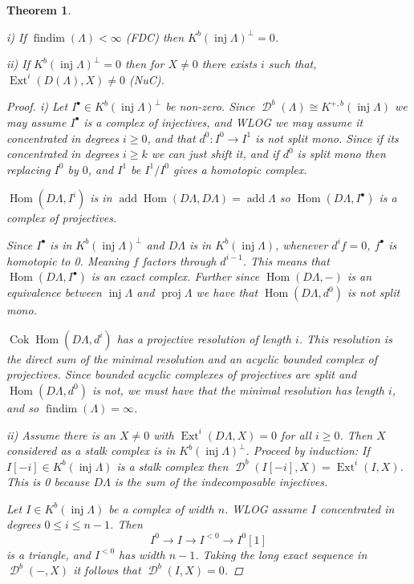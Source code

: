 \documentclass[11pt, a4paper, english]{article}
\newtheorem{theorem}{Theorem}[section]
\theoremstyle{definition}
\DeclareMathOperator{\Hom}{Hom}
\DeclareMathOperator{\Ext}{Ext}
\DeclareMathOperator{\cok}{Cok}
\DeclareMathOperator{\findim}{findim}
\DeclareMathOperator{\inj}{inj}
\DeclareMathOperator{\proj}{proj}
\DeclareMathOperator{\add}{add}
\DeclareMathOperator{\D}{\mathcal{D}}
\begin{document}
\begin{theorem} \cite[1.2]{Hap93} \label{thm:findim_implies_inj_generate}
	\item[i)] If $\findim(\Lambda) < \infty$ (FDC) then $K^b(\inj\Lambda)^\perp = 0$.
	\item[ii)] If $K^b(\inj\Lambda)^\perp = 0$ then for $X\neq 0$ there exists $i$ such that, $\Ext^i(D(\Lambda), X) \neq 0$ (NuC).
	\begin{proof}
		\item[i)] Let $I^\bullet \in K^b(\inj\Lambda)^\perp$ be non-zero. Since $\D^b(\Lambda) \cong K^{+,b}(\inj\Lambda)$ we may assume $I^\bullet$ is a complex of injectives, and WLOG we may assume it concentrated in degrees $i \geq 0$, and that $d^0:I^0 \to I^1$ is not split mono. Since if its concentrated in degrees $i \geq k$ we can just shift it, and if $d^0$ is split mono then replacing $I^0$ by $0$, and $I^1$ be $I^1/I^0$ gives a homotopic complex.
		
		$\Hom(D\Lambda, I^i)$ is in $\add\Hom(D\Lambda, D\Lambda) = \add\Lambda$ so $\Hom(D\Lambda, I^\bullet)$ is a complex of projectives.
		
		
		Since $I^\bullet$ is in $K^b(\inj\Lambda)^\perp$ and $D\Lambda$ is in $K^b(\inj\Lambda)$, whenever $d^if=0$, $f^\bullet$ is homotopic to 0. Meaning $f$ factors through $d^{i-1}$. This means that $\Hom(D\Lambda, I^\bullet)$ is an exact complex. Further since $\Hom(D\Lambda, -)$ is an equivalence between $\inj\Lambda$ and $\proj\Lambda$ we have that $\Hom(D\Lambda, d^0)$ is not split mono.
		
		$\cok\Hom(D\Lambda, d^i)$ has a projective resolution of length $i$. This resolution is the direct sum of the minimal resolution and an acyclic bounded complex of projectives. Since bounded acyclic complexes of projectives are split and $\Hom(D\Lambda, d^0)$ is not, we must have that the minimal resolution has length $i$, and so $\findim(\Lambda) = \infty$.
		
		\item[ii)] Assume there is an $X \neq 0$ with $\Ext^i(D\Lambda, X) = 0$ for all $i \geq 0$. Then $X$ considered as a stalk complex is in $K^b(\inj\Lambda)^\perp$. Proceed by induction: If $I[-i] \in K^b(\inj\Lambda)$ is a stalk complex then $\D^b(I[-i], X) = \Ext^i(I, X)$. This is 0 because $D\Lambda$ is the sum of the indecomposable injectives.
		
		Let $I \in K^b(\inj\Lambda)$ be a complex of width $n$. WLOG assume $I$ concentrated in degrees $0 \leq i \leq n-1$. Then $$I^0 \to I \to I^{<0} \to I^0[1]$$ is a triangle, and $I^{<0}$ has width $n-1$. Taking the long exact sequence in $\D^b(-,X)$ it follows that $\D^b(I, X)=0$.  
	\end{proof}
\end{theorem}
\end{document}
